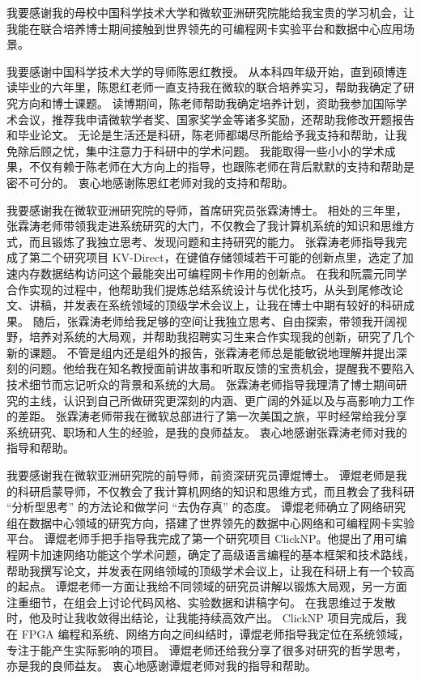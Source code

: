 
\begin{acknowledgements}

我要感谢我的母校中国科学技术⼤学和微软亚洲研究院能给我宝贵的学习机会，让我能在联合培养博士期间接触到世界领先的可编程网卡实验平台和数据中心应用场景。

我要感谢中国科学技术⼤学的导师陈恩红教授。
从本科四年级开始，直到硕博连读毕业的六年里，陈恩红老师一直支持我在微软的联合培养实习，帮助我确定了研究方向和博士课题。
读博期间，陈老师帮助我确定培养计划，资助我参加国际学术会议，推荐我申请微软学者奖、国家奖学金等诸多奖励，还帮助我修改开题报告和毕业论文。
无论是生活还是科研，陈老师都竭尽所能给予我⽀持和帮助，让我免除后顾之忧，集中注意⼒于科研中的学术问题。
我能取得一些小小的学术成果，不仅有赖于陈⽼师在大方向上的指导，也跟陈老师在背后默默的⽀持和帮助是密不可分的。
衷心地感谢陈恩红老师对我的支持和帮助。

我要感谢我在微软亚洲研究院的导师，首席研究员张霖涛博士。
相处的三年里，张霖涛老师带领我走进系统研究的大门，不仅教会了我计算机系统的知识和思维方式，而且锻炼了我独立思考、发现问题和主持研究的能力。
张霖涛老师指导我完成了第二个研究项目 KV-Direct，在键值存储领域若干可能的创新点里，选定了加速内存数据结构访问这个最能突出可编程网卡作用的创新点。
在我和阮震元同学合作实现的过程中，他帮助我们提炼总结系统设计与优化技巧，从头到尾修改论文、讲稿，并发表在系统领域的顶级学术会议上，让我在博士中期有较好的科研成果。
随后，张霖涛老师给我足够的空间让我独立思考、自由探索，带领我开阔视野，培养对系统的大局观，并帮助我招聘实习生来合作实现我的创新，研究了几个新的课题。
不管是组内还是组外的报告，张霖涛老师总是能敏锐地理解并提出深刻的问题。他给我在知名教授面前讲故事和听取反馈的宝贵机会，提醒我不要陷入技术细节而忘记听众的背景和系统的大局。
张霖涛老师指导我理清了博士期间研究的主线，认识到自己所做研究更深刻的内涵、更广阔的外延以及与高影响力工作的差距。
张霖涛老师带我在微软总部进行了第一次美国之旅，平时经常给我分享系统研究、职场和人生的经验，是我的良师益友。
衷心地感谢张霖涛老师对我的指导和帮助。

我要感谢我在微软亚洲研究院的前导师，前资深研究员谭焜博⼠。
谭焜老师是我的科研启蒙导师，不仅教会了我计算机⽹络的知识和思维⽅式，⽽且教会了我科研 ``分析型思考'' 的⽅法论和做学问 ``去伪存真'' 的态度。
谭焜老师确立了网络研究组在数据中心领域的研究方向，搭建了世界领先的数据中心网络和可编程网卡实验平台。
谭焜老师手把手指导我完成了第一个研究项目 ClickNP。他提出了用可编程网卡加速网络功能这个学术问题，确定了高级语言编程的基本框架和技术路线，帮助我撰写论文，并发表在网络领域的顶级学术会议上，让我在科研上有一个较高的起点。
谭焜老师一方面让我给不同领域的研究员讲解以锻炼大局观，另一方面注重细节，在组会上讨论代码风格、实验数据和讲稿字句。
在我思维过于发散时，他及时让我收敛得出结论，让我能持续高效产出。
ClickNP 项目完成后，我在 FPGA 编程和系统、网络方向之间纠结时，谭焜老师指导我定位在系统领域，专注于能产生实际影响的项目。
谭焜老师还给我分享了很多对研究的哲学思考，亦是我的良师益友。
衷⼼地感谢谭焜⽼师对我的指导和帮助。


\end{acknowledgements}
